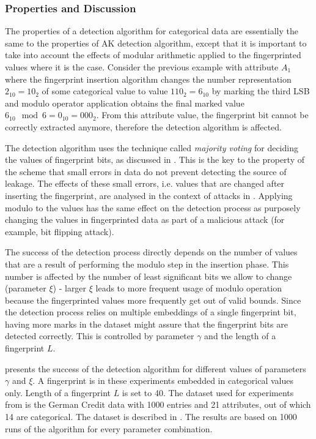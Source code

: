 \subsubsection{Properties and Discussion}
The properties of a detection algorithm for categorical data are essentially the same to the properties of AK detection algorithm, except that it is important to take into account the effects of modular arithmetic applied to the fingerprinted values where it is the case.
Consider the previous example with attribute $A_1$ where the fingerprint insertion algorithm changes the number representation $2_{10}=10_2$ of some categorical value to value $110_2 = 6_{10}$ by marking the third LSB and modulo operator application obtains the final marked value $6_{10} \mod 6 = 0_{10} = 000_2$. 
From this attribute value, the fingerprint bit cannot be correctly extracted anymore, therefore the detection algorithm is affected. 

The detection algorithm uses the technique called \textit{majority voting} for deciding the values of fingerprint bits, as discussed in .
This is the key to the property of the scheme that small errors in data do not prevent detecting the source of leakage. 
The effects of these small errors, i.e. values that are changed after inserting the fingerprint, are analysed in the context of attacks in . 
Applying modulo to the values has the same effect on the detection process as purposely changing the values in fingerprinted data as part of a malicious attack (for example, bit flipping attack). 

 
The success of the detection process directly depends on the number of values that are a result of performing the modulo step in the insertion phase. 
This number is affected by the number of least significant bits we allow to change (parameter $\xi$) - larger $\xi$ leads to more frequent usage of modulo operation because the fingerprinted values more frequently get out of valid bounds. 
Since the detection process relies on multiple embeddings of a single fingerprint bit, having more marks in the dataset might assure that the fingerprint bits are detected correctly.
This is controlled by parameter $\gamma$ and the length of a fingerprint $L$.

 presents the success of the detection algorithm for different values of parameters $\gamma$ and $\xi$. 
A fingerprint is in these experiments embedded in categorical values only.
Length of a fingerprint $L$ is set to 40.
The dataset used for experiments from  is the German Credit data with 1000 entries and 21 attributes, out of which 14 are categorical. The dataset is described in .
The results are based on 1000 runs of the algorithm for every parameter combination.

